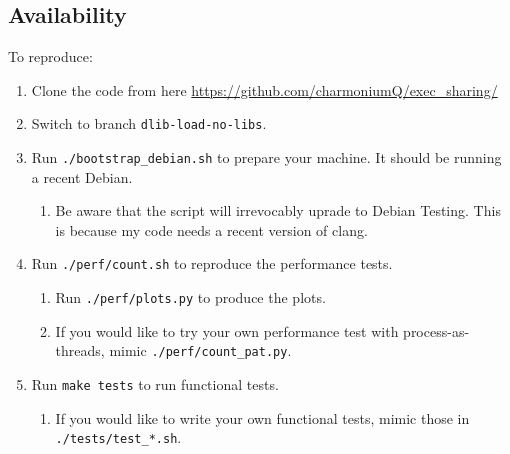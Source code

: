 \documentclass[letterpaper,twocolumn,10pt]{article}
\begin{document}
\subsection{Availability}\label{appendix:availability}

To reproduce:

\begin{enumerate}
\item Clone the code from here \url{https://github.com/charmoniumQ/exec_sharing/}
\item Switch to branch \texttt{dlib-load-no-libs}.
\item Run \texttt{./bootstrap\_debian.sh} to prepare your machine. It should be running a recent Debian.
  \begin{enumerate}
  \item Be aware that the script will irrevocably uprade to Debian Testing. This is because my code needs a recent version of clang.
  \end{enumerate}
\item Run \texttt{./perf/count.sh} to reproduce the performance tests.
  \begin{enumerate}
  \item Run \texttt{./perf/plots.py} to produce the plots.
  \item If you would like to try your own performance test with process-as-threads, mimic \texttt{./perf/count\_pat.py}.
  \end{enumerate}
\item Run \texttt{make tests} to run functional tests.
  \begin{enumerate}
  \item If you would like to write your own functional tests, mimic those in \texttt{./tests/test\_*.sh}.
  \end{enumerate}
\end{enumerate}

\end{document}
